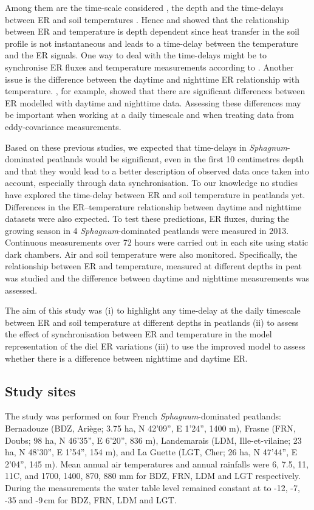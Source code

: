 Among them are the time-scale considered \citep{curielyuste2004}, the depth \citep{graf2008} and the time-delays between ER and soil temperatures \citep{phillips2011}.
Hence \citet{pavelka2007} and \citet{graf2008} showed that the relationship between ER and temperature is depth dependent since heat transfer in the soil profile is not instantaneous and leads to a time-delay between the temperature and the ER signals.
One way to deal with the time-delays might be to synchronise ER fluxes and temperature measurements according to \citet{pavelka2007}.
Another issue is the difference between the daytime and nighttime ER relationship with temperature. 
\citet{juszczak2012}, for example, showed that there are significant differences between ER modelled with daytime and nighttime data.
Assessing these differences may be important when working at a daily timescale and when treating data from eddy-covariance measurements.

Based on these previous studies, we expected that time-delays in \textit{Sphagnum}-dominated peatlands would be significant, even in the first 10 centimetres depth and that they would lead to a better description of observed data once taken into account, especially through data synchronisation.
To our knowledge no studies have explored the time-delay between ER and soil temperature in peatlands yet.
Differences in the ER--temperature relationship between daytime and nighttime datasets were also expected.
To test these predictions, ER fluxes, during the growing season in 4 \textit{Sphagnum}-dominated peatlands were measured in 2013.
Continuous measurements over 72 hours were carried out in each site using static dark chambers.
Air and soil temperature were also monitored.
Specifically, the relationship between ER and temperature, measured at different depths in peat was studied and the difference between daytime and nighttime measurements was assessed.

The aim of this study was (i) to highlight any time-delay at the daily timescale between ER and soil temperature at different depths in peatlands (ii) to assess the effect of synchronisation between ER and temperature in the model representation of the diel ER variations (iii) to use the improved model to assess whether there is a difference between nighttime and daytime ER.

\subsection{Study sites}
The study was performed on four French \textit{Sphagnum}-dominated peatlands:
Bernadouze (BDZ, Ari\`ege; 3.75 ha, N 42’09”, E 1’24”, 1400 m), Frasne (FRN, Doubs; 98 ha, N 46’35”, E 6’20”, 836 m), Landemarais (LDM, Ille-et-vilaine; 23 ha, N 48’30”, E 1’54”, 154 m), and La Guette (LGT, Cher; 26 ha, N 47’44”, E 2’04”, 145 m).
Mean annual air temperatures and annual rainfalls were 6, 7.5, 11, 11\textdegree C, and 1700, 1400, 870, 880 mm for BDZ, FRN, LDM and LGT respectively.
During the measurements the water table level remained constant at to -12, -7, -35 and -9\,cm for BDZ, FRN, LDM and LGT.

